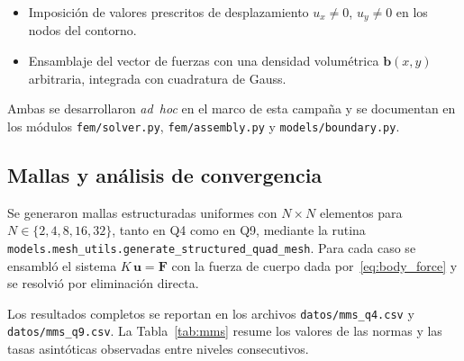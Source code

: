 \begin{itemize}
  \item Imposición de valores prescritos de desplazamiento $u_x \neq 0$, $u_y \neq 0$
        en los nodos del contorno.
  \item Ensamblaje del vector de fuerzas con una densidad volumétrica
        $\mathbf{b}(x,y)$ arbitraria, integrada con cuadratura de Gauss.
\end{itemize}

\noindent Ambas se desarrollaron \emph{ad~hoc} en el marco de esta campaña
y se documentan en los módulos \verb|fem/solver.py|, \verb|fem/assembly.py| y
\verb|models/boundary.py|.

\subsection{Mallas y análisis de convergencia}

Se generaron mallas estructuradas uniformes con $N \times N$ elementos
para $N \in \{2, 4, 8, 16, 32\}$, tanto en Q4 como en Q9, mediante la
rutina \verb|models.mesh_utils.generate_structured_quad_mesh|. Para cada
caso se ensambló el sistema $K\,\mathbf{u} = \mathbf{F}$ con la fuerza de
cuerpo dada por~\eqref{eq:body_force} y se resolvió por eliminación
directa.

Los resultados completos se reportan en los archivos
\verb|datos/mms_q4.csv| y \verb|datos/mms_q9.csv|. La
Tabla~\ref{tab:mms} resume los valores de las normas y las tasas
asintóticas observadas entre niveles consecutivos.

